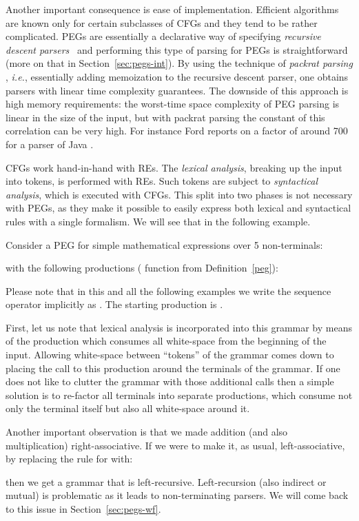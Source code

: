 \documentclass{LMCS}
\newcommand{\exqed}{\hfill\vspace{1ex}}
\newcommand{\ie}{\textit{i.e.}}
\theoremstyle{definition}
\begin{document}
Another important consequence is ease of implementation. Efficient algorithms are
known only for certain subclasses of CFGs and they tend to be rather complicated. 
PEGs are essentially a declarative way of specifying \emph{recursive descent parsers}~\cite{Bur75}
and performing this type of parsing for PEGs is straightforward (more
on that in Section~\ref{sec:pegs-int}). By using the technique of
\emph{packrat parsing} \cite{AhoUll72,For02}, \ie, essentially adding memoization to the
recursive descent parser, one obtains parsers with linear time complexity guarantees. 
The downside of this approach is high memory requirements: the worst-time space complexity 
of PEG parsing is linear in the size of the input, but with packrat parsing the
constant of this correlation can be very high. For instance Ford reports on a factor 
of around 700 for a parser of Java \cite{For02}.

CFGs work hand-in-hand with REs. The \emph{lexical analysis}, breaking up the input 
into tokens, is performed with REs. Such tokens are subject to \emph{syntactical analysis},
which is executed with CFGs. This split into two phases is not necessary with PEGs, 
as they make it possible to easily express both lexical and syntactical rules with
a single formalism. We will see that in the following example.



\begin{exa}\label{math_peg}
 Consider a PEG for simple mathematical expressions over 5 non-terminals:
   
with the following productions ( function from Definition~\ref{peg}):

Please note that in this and all the following examples we write the
sequence operator  implicitly as . The starting 
production is .

First, let us note that lexical analysis is incorporated into this grammar by means
of the  production which consumes all white-space from the beginning of the input.
Allowing white-space between ``tokens'' of the grammar comes down to placing 
the call to this production around the terminals of the grammar. If one does not 
like to clutter the grammar with those additional calls then a simple solution is
to re-factor all terminals into separate productions, which consume not only the terminal
itself but also all white-space around it.

Another important observation is that we made addition (and also multiplication) right-associative.
If we were to make it, as usual, left-associative, by replacing the rule 
for  with:



\noindent then we get a grammar that is left-recursive. Left-recursion (also indirect or mutual)
is problematic as it leads to non-terminating parsers. We will come back to this issue
in Section~\ref{sec:pegs-wf}. 
\exqed
\end{exa}
\end{document}
